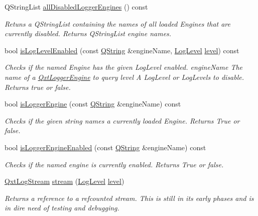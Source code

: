 \begin{DoxyCompactItemize}
Q\-String\-List \hyperlink{class_qxt_logger_a960e595f7acb8877d9d9f0697409a180}{all\-Disabled\-Logger\-Engines} () const 
\begin{DoxyCompactList}\small\item\em Retuns a Q\-String\-List containing the names of all loaded Engines that are currently disabled. Returns Q\-String\-List engine names. \end{DoxyCompactList}\item 
bool \hyperlink{class_qxt_logger_a4e907a38bfa5d9e3f3f107289df131a0}{is\-Log\-Level\-Enabled} (const \hyperlink{group___u_a_v_objects_plugin_gab9d252f49c333c94a72f97ce3105a32d}{Q\-String} \&engine\-Name, \hyperlink{class_qxt_logger_ac2071072628aa786466124cc32a324e7}{Log\-Level} \hyperlink{glext_8h_abc60a79088789bd61297bf5f9ff500d1}{level}) const 
\begin{DoxyCompactList}\small\item\em Checks if the named Engine has the given Log\-Level enabled. {\itshape engine\-Name} The name of a \hyperlink{class_qxt_logger_engine}{Qxt\-Logger\-Engine} to query {\itshape level} A Log\-Level or Log\-Levels to disable. Returns true or false. \end{DoxyCompactList}\item 
bool \hyperlink{class_qxt_logger_ac9f1ab74e1392d6000a77770c7a664cc}{is\-Logger\-Engine} (const \hyperlink{group___u_a_v_objects_plugin_gab9d252f49c333c94a72f97ce3105a32d}{Q\-String} \&engine\-Name) const 
\begin{DoxyCompactList}\small\item\em Checks if the given string names a currently loaded Engine. Returns True or false. \end{DoxyCompactList}\item 
bool \hyperlink{class_qxt_logger_a7bb353e22c306565f649cca5f32e13fc}{is\-Logger\-Engine\-Enabled} (const \hyperlink{group___u_a_v_objects_plugin_gab9d252f49c333c94a72f97ce3105a32d}{Q\-String} \&engine\-Name) const 
\begin{DoxyCompactList}\small\item\em Checks if the named engine is currently enabled. Returns True or false. \end{DoxyCompactList}\item 
\hyperlink{class_qxt_log_stream}{Qxt\-Log\-Stream} \hyperlink{class_qxt_logger_afa1a7a7f0c76c6ac798dec69296ba19a}{stream} (\hyperlink{class_qxt_logger_ac2071072628aa786466124cc32a324e7}{Log\-Level} \hyperlink{glext_8h_abc60a79088789bd61297bf5f9ff500d1}{level})
\begin{DoxyCompactList}\small\item\em Returns a reference to a refcounted stream. This is still in its early phases and is in dire need of testing and debugging. \end{DoxyCompactList}\item 

\end{DoxyCompactItemize}
